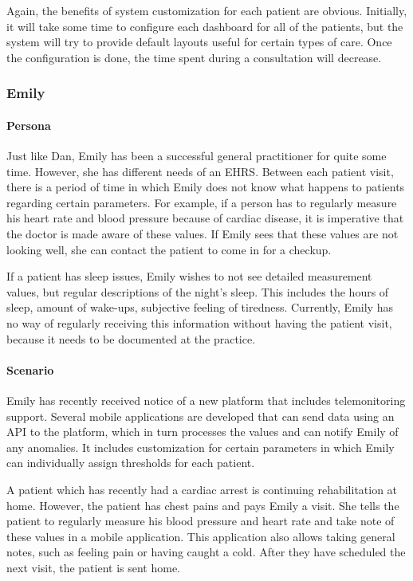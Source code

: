         \noindent Again, the benefits of system customization for each patient are obvious. Initially, it will take some time to configure each dashboard for all of the patients, but the system will try to provide default layouts useful for certain types of care. Once the configuration is done, the time spent during a consultation will decrease.
        
        \subsubsection{Emily}

        \paragraph{Persona} Just like Dan, Emily has been a successful general practitioner for quite some time. However, she has different needs of an EHRS. Between each patient visit, there is a period of time in which Emily does not know what happens to patients regarding certain parameters. For example, if a person has to regularly measure his heart rate and blood pressure because of cardiac disease, it is imperative that the doctor is made aware of these values. If Emily sees that these values are not looking well, she can contact the patient to come in for a checkup.

        If a patient has sleep issues, Emily wishes to not see detailed measurement values, but regular descriptions of the night’s sleep. This includes the hours of sleep, amount of wake-ups, subjective feeling of tiredness. Currently, Emily has no way of regularly receiving this information without having the patient visit, because it needs to be documented at the practice.
        
        \paragraph{Scenario} Emily has recently received notice of a new platform that includes telemonitoring support. Several mobile applications are developed that can send data using an API to the platform, which in turn processes the values and can notify Emily of any anomalies. It includes customization for certain parameters in which Emily can individually assign thresholds for each patient.

        A patient which has recently had a cardiac arrest is continuing rehabilitation at home. However, the patient has chest pains and pays Emily a visit. She tells the patient to regularly measure his blood pressure and heart rate and take note of these values in a mobile application. This application also allows taking general notes, such as feeling pain or having caught a cold. After they have scheduled the next visit, the patient is sent home.
        
